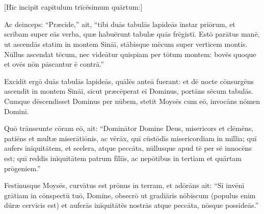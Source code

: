 \chapter{}


\thispagestyle{empty}

[Hīc incipit capitulum trīcēsimum quārtum:]

Ac deinceps:
``Præcīde,'' ait, ``tibi duās tabulās lapideās īnstar priōrum, et
scrībam super eās verba, quæ habuērunt tabulæ quās frēgistī. 
Estō parātus
manē, ut ascendās statim in montem Sināī, stābisque mēcum super
verticem montis. 
Nūllus
ascendat tēcum, nec videātur quispiam per tōtum montem:
bovēs quoque et ovēs nōn pāscantur ē contrā.''

Excidit ergō
duās tabulās lapideās, quālēs anteā fuerant: et dē nocte
cōnsurgēns ascendit in montem Sināī, sīcut
præcēperat eī Dominus, portāns sēcum tabulās. 
Cumque dēscendisset Dominus per nūbem, stetit Moysēs cum
eō, invocāns nōmen Dominī. 

Quō trānseunte cōram eō, ait: ``Dominātor
Domine Deus, misericors et clēmēns, patiēns et multæ
miserātiōnis, ac vērāx, 
quī cūstōdīs
misericordiam in mīllia; quī aufers inīquitātem, et
scelera, atque peccāta, nūllusque
apud tē per sē innocēns est; quī reddis inīquitātem patrum
fīliīs, ac nepōtibus in tertiam et quārtam
prōgeniem.''

Festīnusque Moysēs, curvātus est prōnus in terram, et
adōrāns 
ait: ``Sī invēnī grātiam in cōnspectū tuō, Domine,
obsecrō ut gradiāris nōbīscum (populus enim
dūræ cervīcis est)
et auferās inīquitātēs nostrās atque peccāta, nōsque possideās.''

